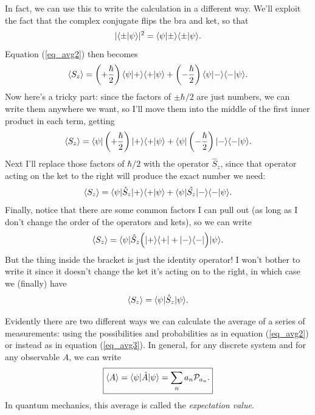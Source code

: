 In fact, we can use this to write the calculation in a different way.  We'll exploit the fact that the complex conjugate flips the bra and ket, so that
\[
|\langle \pm | \psi \rangle|^2 = \langle \psi | \pm \rangle \langle \pm | \psi \rangle.
\]
Equation (\ref{eq_avg2}) then becomes
\[
\langle S_z \rangle = \left(+\frac{\hbar}{2} \right) \langle \psi | + \rangle \langle + | \psi \rangle + \left(-\frac{\hbar}{2} \right) \langle \psi | - \rangle \langle - | \psi \rangle.
\]
Now here's a tricky part:  since the factors of $\pm\hbar/2$ are just numbers, we can write them anywhere we want, so I'll move them into the middle of the first inner product in each term, getting
\[
\langle S_z \rangle =  \langle \psi |\left(+\frac{\hbar}{2} \right)| + \rangle \langle + | \psi \rangle + \langle \psi |\left(-\frac{\hbar}{2} \right)| - \rangle \langle - | \psi \rangle.
\]
Next I'll replace those factors of $\hbar/2$ with the operator $\hat{S}_z$, since that operator acting on the ket to the right will produce the exact number we need:
\[
\langle S_z \rangle =  \langle \psi | \hat{S}_z | + \rangle \langle + | \psi \rangle + \langle \psi | \hat{S_z} | - \rangle \langle - | \psi \rangle.
\]
Finally, notice that there are some common factors I can pull out (as long as I don't change the order of the operators and kets), so we can write
\[
\langle S_z \rangle =  \langle \psi | \hat{S}_z \Big( | + \rangle\langle + | + | - \rangle\langle - | \Big) | \psi \rangle.
\]
But the thing inside the bracket is just the identity operator!  I won't bother to write it since it doesn't change the ket it's acting on to the right, in which case we (finally) have
\begin{equation}
\label{eq_avg3}
\langle S_z \rangle = \langle \psi | \hat{S}_z | \psi \rangle.
\end{equation}

Evidently there are two different ways we can calculate the average of a series of measurements:  using the possibilities and probabilities as in equation (\ref{eq_avg2}) or instead as in equation (\ref{eq_avg3}).  In general, for any discrete system and for any observable $A$, we can write
\begin{equation}
\boxed{
\langle A \rangle = \langle \psi | \hat{A} | \psi \rangle = \sum_n a_n \mathcal{P}_{a_n}.
}
\end{equation}
In quantum mechanics, this average is called the \emph{expectation value}.

